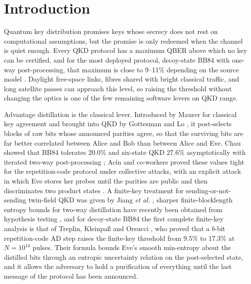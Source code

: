\documentclass[aps,pra,twocolumn,superscriptaddress,nofootinbib]{revtex4-2}
\begin{document}
\section{Introduction}
Quantum key distribution promises keys whose secrecy does not rest on computational assumptions, but the promise is only redeemed when the channel is quiet enough. Every QKD protocol has a maximum QBER above which no key can be certified, and for the most deployed protocol, decoy-state BB84 with one-way post-processing, that maximum is close to 9--11\% depending on the source model \cite{T25,Lim14}. Daylight free-space links, fibres shared with bright classical traffic, and long satellite passes can approach this level, so raising the threshold without changing the optics is one of the few remaining software levers on QKD range.

Advantage distillation is the classical lever. Introduced by Maurer for classical key agreement \cite{Maurer93} and brought into QKD by Gottesman and Lo \cite{GL03}, it post-selects blocks of raw bits whose announced parities agree, so that the surviving bits are far better correlated between Alice and Bob than between Alice and Eve. Chau showed that BB84 tolerates 20.0\% and six-state QKD 27.6\% asymptotically with iterated two-way post-processing \cite{Chau02}; Acín and co-workers proved these values tight for the repetition-code protocol under collective attacks, with an explicit attack in which Eve stores her probes until the parities are public and then discriminates two product states \cite{ABBMM06,BA07}. A finite-key treatment for sending-or-not-sending twin-field QKD was given by Jiang \emph{et al.} \cite{Jiang21}, sharper finite-blocklength entropy bounds for two-way distillation have recently been obtained from hypothesis testing \cite{BMB26}, and for decoy-state BB84 the first complete finite-key analysis is that of Treplin, Kleinpaß and Orsucci \cite{T25}, who proved that a $b$-bit repetition-code AD step raises the finite-key threshold from 9.5\% to 17.3\% at $N=10^{14}$ pulses. Their formula bounds Eve's smooth min-entropy about the distilled bits through an entropic uncertainty relation on the post-selected state, and it allows the adversary to hold a purification of everything until the last message of the protocol has been announced.
\end{document}
